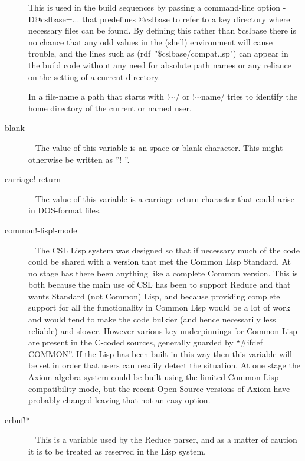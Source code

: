 \documentclass[a4paper,11pt]{article}
\begin{document}
\begin{description}
This is used in the build sequences by passing a command-line
option {\ttfamily -D@cslbase=...} that predefines
{\ttfamily @cslbase} to refer to a key directory where necessary files
can be found.
By defining this rather than {\ttfamily \$cslbase} there is no chance that
any odd values in the (shell) environment will cause trouble, and the
lines such as {\ttfamily (rdf~"\$cslbase/compat.lsp")} can appear in the build
code without any need for absolute path names or any
reliance on the setting of a current directory.
  
In a file-name a path that starts with {\ttfamily !$\sim$/} or
{\ttfamily !$\sim$name/} tries to identify the home directory of the
current or named user.

\item [{\ttfamily blank}]  ~\newline
The value of this variable is an space or blank character. This
might otherwise be written as ''{\ttfamily ! }''.

\item [{\ttfamily carriage!-return}]  ~\newline
The value of this variable is a carriage-return character that could arise
in DOS-format files.

\item [{\ttfamily common!-lisp!-mode}]  ~\newline
The CSL Lisp system was designed so that if necessary much of the code could
be shared with a version that met the Common Lisp Standard. At no stage has
there been anything like a complete Common version. This is both because the
main use of CSL has been to support Reduce and that wants Standard (not
Common) Lisp, and because providing complete support for all the
functionality in Common Lisp would be a lot of work and would tend to make
the code bulkier (and hence necessarily less reliable) and slower. However
various key underpinnings for Common Lisp are present in the C-coded sources,
generally guarded by ``{\ttfamily \#ifdef COMMON}''. If the Lisp has been
built in this way then this variable will be set in order that users can
readily detect the situation.  At one stage the Axiom algebra system could
be built using the limited Common Lisp compatibility mode, but the recent
Open Source versions of Axiom have probably changed leaving that not an
easy option.

\item [{\ttfamily crbuf!*}]  ~\newline
This is a variable used by the Reduce parser, and as a matter of caution it
is to be treated as reserved in the Lisp system. 


\end{description}
\end{document}
